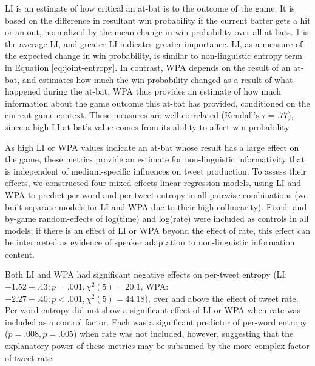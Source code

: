 \documentclass[11pt,letterpaper]{article}
\begin{document}

LI is an estimate of how critical an at-bat is to the outcome of the game.  It is based on the difference in resultant win probability if the current batter gets a hit or an out, normalized by the mean change in win probability over all at-bats. 1 is the average LI, and greater LI indicates greater importance.  LI, as a measure of the expected change in win probability, is similar to non-linguistic entropy term in Equation \ref{eq:joint-entropy}.  In contrast, WPA depends on the result of an at-bat, and estimates how much the win probability changed as a result of what happened during the at-bat.  WPA thus provides an estimate of how much information about the game outcome this at-bat has provided, conditioned on the current game context.  These measures are well-correlated (Kendall's $\tau=.77$), since a high-LI at-bat's value comes from its ability to affect win probability.

As high LI or WPA values indicate an at-bat whose result has a large effect on the game, these metrics provide an estimate for non-linguistic informativity that is independent of medium-specific influences on tweet production.  To assess their effects, we constructed four mixed-effects linear regression models, using LI and WPA to predict per-word and per-tweet entropy in all pairwise combinations (we built separate models for LI and WPA due to their high collinearity). Fixed- and by-game random-effects of log(time) and log(rate) were included as controls in all models; if there is an effect of LI or WPA beyond the effect of rate, this effect can be interpreted as evidence of speaker adaptation to non-linguistic information content.

Both LI and WPA had significant negative effects on per-tweet entropy (LI: $-1.52 \pm .43; p=.001, \chi^2(5)=20.1$, WPA: $-2.27 \pm .40; p<.001, \chi^2(5)=44.18$), over and above the effect of tweet rate.  Per-word entropy did not show a significant effect of LI or WPA when rate was included as a control factor. Each was a significant predictor of per-word entropy ($p=.008,p=.005$) when rate was not included, however, suggesting that the explanatory power of these metrics may be subsumed by the more complex factor of tweet rate.
\end{document}
